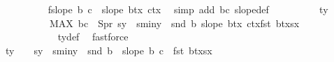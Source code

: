 \begin{isabellebody}
\ \ \ \ \ \ \ \ \isamarkupfalse%
\ f{}{\isacharcolon}{\kern0pt}{\isachardoublequoteopen}slope\ b\ c\ {\isacharequal}{\kern0pt}\ slope\ {\isacharparenleft}{\kern0pt}b{}{\isacharplus}{\kern0pt}{\isacharparenleft}{\kern0pt}tx{\isacharcomma}{\kern0pt}{}{\isacharparenright}{\kern0pt}{\isacharparenright}{\kern0pt}\ {\isacharparenleft}{\kern0pt}c{}{\isacharplus}{\kern0pt}{\isacharparenleft}{\kern0pt}tx{\isacharcomma}{\kern0pt}{}{\isacharparenright}{\kern0pt}{\isacharparenright}{\kern0pt}{\isachardoublequoteclose}\ \isamarkupfalse%
\ {\isacharparenleft}{\kern0pt}simp\ add{\isacharcolon}{\kern0pt}\ b{}c{}{\isacharparenleft}{\kern0pt}{}{\isacharcomma}{\kern0pt}{}{\isacharparenright}{\kern0pt}\ slope{\isacharunderscore}{\kern0pt}def{\isacharparenright}{\kern0pt}\isanewline
\ \ \ \ \ \ \ \ \isamarkupfalse%
\ {\isachardoublequoteopen}ty{}\ {\isasymge}\ \isanewline
\ \ \ \ \ \ \ \ \ \ {\isacharparenleft}{\kern0pt}MAX\ {\isacharparenleft}{\kern0pt}b{\isacharcomma}{\kern0pt}c{\isacharparenright}{\kern0pt}\ {\isasymin}\ S{}pr{\isachardot}{\kern0pt}\ s{}y\ {\isacharplus}{\kern0pt}\ s{}{\isacharunderscore}{\kern0pt}miny\ {\isacharminus}{\kern0pt}\ snd\ b\ {\isacharplus}{\kern0pt}{\isacharparenleft}{\kern0pt}slope\ {\isacharparenleft}{\kern0pt}b{\isacharplus}{\kern0pt}{\isacharparenleft}{\kern0pt}tx{\isacharcomma}{\kern0pt}{}{\isacharparenright}{\kern0pt}{\isacharparenright}{\kern0pt}\ {\isacharparenleft}{\kern0pt}c{\isacharplus}{\kern0pt}{\isacharparenleft}{\kern0pt}tx{\isacharcomma}{\kern0pt}{}{\isacharparenright}{\kern0pt}{\isacharparenright}{\kern0pt}{\isacharparenright}{\kern0pt}{\isacharasterisk}{\kern0pt}{\isacharparenleft}{\kern0pt}fst\ b{\isacharplus}{\kern0pt}tx{\isacharminus}{\kern0pt}s{}x{\isacharparenright}{\kern0pt}{\isacharparenright}{\kern0pt}{\isachardoublequoteclose}\ \isanewline
\ \ \ \ \ \ \ \ \ \ \isamarkupfalse%
\ ty{}{\isacharunderscore}{\kern0pt}def\ \isamarkupfalse%
\ fastforce\isanewline
\ \ \ \ \ \ \ \ \isamarkupfalse%
\ {\isachardoublequoteopen}ty{}\ {\isacharplus}{\kern0pt}\ {}\ {\isachargreater}{\kern0pt}\ s{}y\ {\isacharplus}{\kern0pt}\ s{}{\isacharunderscore}{\kern0pt}miny\ {\isacharminus}{\kern0pt}\ snd\ b{}\ {\isacharplus}{\kern0pt}\ slope\ b\ c\ {\isacharasterisk}{\kern0pt}\ {\isacharparenleft}{\kern0pt}fst\ b{}{\isacharplus}{\kern0pt}tx{\isacharminus}{\kern0pt}s{}x{\isacharparenright}{\kern0pt}{\isachardoublequoteclose}\isanewline

\end{isabellebody}
